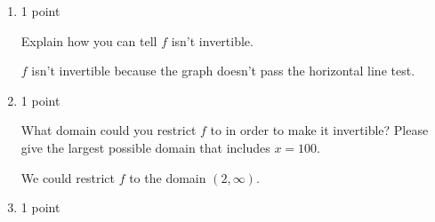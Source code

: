 \documentclass{article}
\begin{document}
\begin{enumerate}
\begin{enumerate}
    \begin{solution}
      Starting with the graph of $y=\frac{1}{x^2}$, we shift to the right $2$ units,
      reflect over the $x$-axis, then shift up $5$ units.

      \begin{center}
      \end{center}
    \end{solution}

  \item

    \begin{grading}
      1 point
    \end{grading}

    \begin{problem}[\stretch{0.5}]
      Explain how you can tell $f$ isn't invertible.
    \end{problem}

    \begin{solution}
      $f$ isn't invertible because the graph doesn't pass the horizontal line test.
    \end{solution}

  \item

    \begin{grading}
      1 point
    \end{grading}

    \begin{problem}[\stretch{0.5}]
      What domain could you restrict $f$ to in order to make it invertible? Please give the largest possible domain that includes $x = 100$.
    \end{problem}

    \begin{solution}
      We could restrict $f$ to the domain $(2, \infty)$.
    \end{solution}

  \item

    \begin{grading}
      1 point
    \end{grading}


\end{enumerate}
\end{enumerate}
\end{document}

